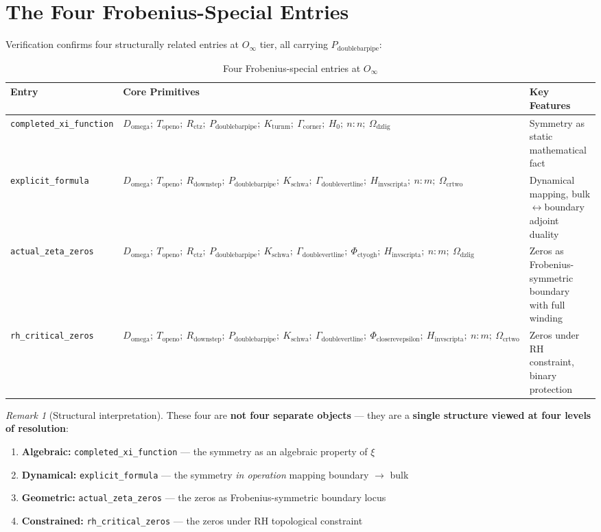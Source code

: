 \documentclass[12pt,oneside]{article}
\theoremstyle{definition}
\theoremstyle{remark}
\newtheorem{remark}[theorem]{Remark}
\newcommand{\Domega}{D_{\text{omega}}}
\newcommand{\Topeno}{T_{\text{openo}}}
\newcommand{\Rdownstep}{R_{\text{downstep}}}
\newcommand{\Rctz}{R_{\text{ctz}}}
\newcommand{\Pdoublebarpipe}{P_{\text{doublebarpipe}}}
\newcommand{\Kschwa}{K_{\text{schwa}}}
\newcommand{\Kturnm}{K_{\text{turnm}}}
\newcommand{\Gammadoublevertline}{\Gamma_{\text{doublevertline}}}
\newcommand{\Gammacorner}{\Gamma_{\text{corner}}}
\newcommand{\Phictyogh}{\Phi_{\text{ctyogh}}}
\newcommand{\Phicloserevepsilon}{\Phi_{\text{closerevepsilon}}}
\newcommand{\Hinvscripta}{H_{\text{invscripta}}}
\newcommand{\Hzero}{H_0}
\newcommand{\Omegadzlig}{\Omega_{\text{dzlig}}}
\newcommand{\Omegacrtwo}{\Omega_{\text{crtwo}}}
\begin{document}
\section{The Four Frobenius-Special Entries}

Verification confirms four structurally related entries at $O_\infty$ tier, all carrying $\Pdoublebarpipe$:

\begin{table}[htbp]
\centering
\caption{Four Frobenius-special entries at $O_\infty$}
\small
\begin{tabular}{p{2.8cm}p{2.5cm}p{8.5cm}}
\toprule
\textbf{Entry} & \textbf{Core Primitives} & \textbf{Key Features} \\
\midrule
\texttt{completed\_xi\_function}
  & $\Domega;\ \Topeno;\ \Rctz;\ \Pdoublebarpipe;\ \Kturnm;\ \Gammacorner;\ \Hzero;\ n{:}n;\ \Omegadzlig$
  & Symmetry as static mathematical fact \\[8pt]
\texttt{explicit\_formula}
  & $\Domega;\ \Topeno;\ \Rdownstep;\ \Pdoublebarpipe;\ \Kschwa;\ \Gammadoublevertline;\ \Hinvscripta;\ n{:}m;\ \Omegacrtwo$
  & Dynamical mapping, bulk$\leftrightarrow$boundary adjoint duality \\[8pt]
\texttt{actual\_zeta\_zeros}
  & $\Domega;\ \Topeno;\ \Rctz;\ \Pdoublebarpipe;\ \Kschwa;\ \Gammadoublevertline;\ \Phictyogh;\ \Hinvscripta;\ n{:}m;\ \Omegadzlig$
  & Zeros as Frobenius-symmetric boundary with full winding \\[8pt]
\texttt{rh\_critical\_zeros}
  & $\Domega;\ \Topeno;\ \Rdownstep;\ \Pdoublebarpipe;\ \Kschwa;\ \Gammadoublevertline;\ \Phicloserevepsilon;\ \Hinvscripta;\ n{:}m;\ \Omegacrtwo$
  & Zeros under RH constraint, binary protection \\
\bottomrule
\end{tabular}
\end{table}

\begin{remark}[Structural interpretation]
These four are \textbf{not four separate objects} --- they are a \textbf{single structure viewed at four levels of resolution}:

\begin{enumerate}
\item \textbf{Algebraic:} \texttt{completed\_xi\_function} --- the symmetry as an algebraic property of $\xi$
\item \textbf{Dynamical:} \texttt{explicit\_formula} --- the symmetry \emph{in operation} mapping boundary $\to$ bulk
\item \textbf{Geometric:} \texttt{actual\_zeta\_zeros} --- the zeros as Frobenius-symmetric boundary locus
\item \textbf{Constrained:} \texttt{rh\_critical\_zeros} --- the zeros under RH topological constraint
\end{enumerate}
\end{remark}
\end{document}
